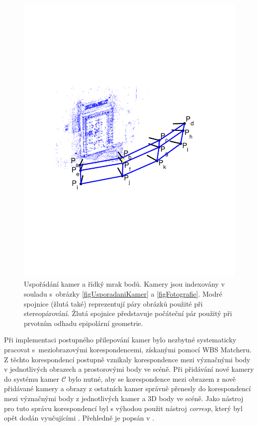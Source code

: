 \documentclass[11pt,oneside,a4paper,pdftex]{article}   %
\begin{document}
			\begin{figure}[htbp]
					\centering
						\includegraphics[width=13cm,clip=true,trim=3cm 8.5cm 3cm 8cm]{pictures/cameras_and_sparse_points_cloud.pdf}
				\caption{Uspořádání kamer a řídký mrak bodů. Kamery jsou indexovány v souladu s~obrázky
					\ref{figUsporadaniKamer} a \ref{figFotografie}. Modré spojnice (žlutá také)
					reprezentují páry obrázků použité při stereopárování. Žlutá spojnice představuje
					počáteční pár použitý při prvotním odhadu epipolární geometrie.
					}
				\label{figCamerasAndSparseCloud}
			\end{figure}

		Při implementaci postupného přilepování kamer bylo nezbytné systematicky pracovat
		s~meziobrazovými korespondencemi, získanými pomocí WBS Matcheru. Z těchto korespondencí postupně
		vznikaly korespondence mezi význačnými body v jednotlivých obrazech a prostorovými body ve scéně.
		Při přidávání nové kamery do systému kamer $\mathcal C$ bylo nutné, aby se korespondence mezi
		obrazem z nově přidávané kamery a obrazy z ostatních kamer správně přenesly do korespondencí mezi
		význačnými body z jednotlivých kamer a 3D body ve scéně.
		Jako nástroj pro tuto správu korespondencí byl s výhodou použit nástroj \emph{corresp},
		který byl opět dodán vyučujícími \cite{code_repo}. Přehledně je popsán v
		\cite{gluing_correspondences}.
		
\end{document}
